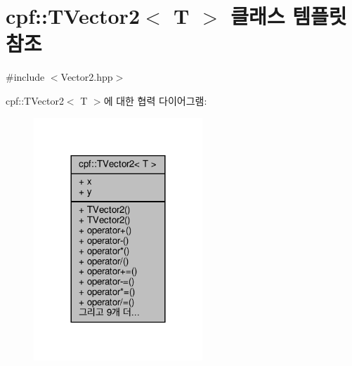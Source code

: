 \hypertarget{classcpf_1_1_t_vector2}{}\section{cpf\+:\+:T\+Vector2$<$ T $>$ 클래스 템플릿 참조}
\label{classcpf_1_1_t_vector2}


{\ttfamily \#include $<$Vector2.\+hpp$>$}



cpf\+:\+:T\+Vector2$<$ T $>$에 대한 협력 다이어그램\+:
\nopagebreak
\begin{figure}[H]
\begin{center}
\leavevmode
\includegraphics[width=180pt]{classcpf_1_1_t_vector2__coll__graph}
\end{center}
\end{figure}
